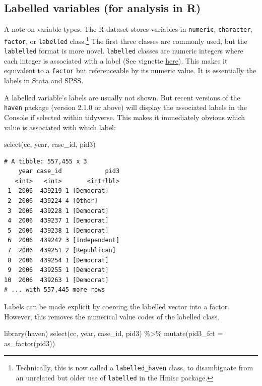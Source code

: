 \documentclass[10pt,article,oneside]{memoir}
\theoremstyle{definition}
\newenvironment{Shaded}{\begin{snugshade}}{\end{snugshade}}
\newcommand{\AttributeTok}[1]{\textcolor[rgb]{0.77,0.63,0.00}{#1}}
\newcommand{\FunctionTok}[1]{\textcolor[rgb]{0.00,0.00,0.00}{#1}}
\newcommand{\NormalTok}[1]{#1}
\newcommand{\SpecialCharTok}[1]{\textcolor[rgb]{0.00,0.00,0.00}{#1}}
\begin{document}
\hypertarget{labelled-variables-for-analysis-in-r}{%
\subsection{Labelled variables (for analysis in
R)}\label{labelled-variables-for-analysis-in-r}}

A note on variable types. The R dataset stores variables in
\texttt{numeric}, \texttt{character}, \texttt{factor}, or
\texttt{labelled} class.\footnote{Technically, this is now called a
  \texttt{labelled\_haven} class, to disambiguate from an unrelated but
  older use of \texttt{labelled} in the Hmisc package.} The first three
classes are commonly used, but the \texttt{lablelled} format is more
novel. \texttt{labelled} classes are numeric integers where each integer
is associated with a label (See vignette
\href{https://cran.r-project.org/web/packages/labelled/vignettes/intro_labelled.html}{here}).
This makes it equivalent to a \texttt{factor} but referenceable by its
numeric value. It is essentially the labels in Stata and SPSS.

A labelled variable's labels are usually not shown. But recent versions
of the \texttt{haven} package (version 2.1.0 or above) will display the
associated labels in the Console if selected within tidyverse. This
makes it immediately obvious which value is associated with which label:

\begin{Shaded}
\begin{Highlighting}[]
\FunctionTok{select}\NormalTok{(cc, year, case\_id, pid3)}
\end{Highlighting}
\end{Shaded}

\begin{verbatim}
# A tibble: 557,455 x 3
    year case_id            pid3
   <int>   <int>       <int+lbl>
 1  2006  439219 1 [Democrat]   
 2  2006  439224 4 [Other]      
 3  2006  439228 1 [Democrat]   
 4  2006  439237 1 [Democrat]   
 5  2006  439238 1 [Democrat]   
 6  2006  439242 3 [Independent]
 7  2006  439251 2 [Republican] 
 8  2006  439254 1 [Democrat]   
 9  2006  439255 1 [Democrat]   
10  2006  439263 1 [Democrat]   
# ... with 557,445 more rows
\end{verbatim}

\noindent Labels can be made explicit by coercing the labelled vector
into a factor. However, this removes the numerical value codes of the
labelled class.

\begin{Shaded}
\begin{Highlighting}[]
\FunctionTok{library}\NormalTok{(haven)}
\FunctionTok{select}\NormalTok{(cc, year, case\_id, pid3) }\SpecialCharTok{\%\textgreater{}\%} 
  \FunctionTok{mutate}\NormalTok{(}\AttributeTok{pid3\_fct =} \FunctionTok{as\_factor}\NormalTok{(pid3))}
\end{Highlighting}
\end{Shaded}
\end{document}

